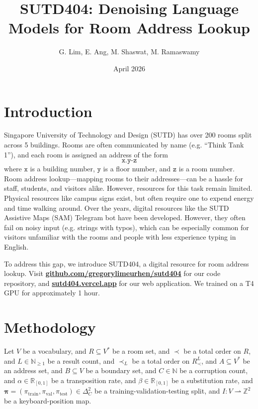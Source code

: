\documentclass{article}
\title{SUTD404: Denoising Language Models for Room Address Lookup}
\author{
	G. Lim,
	E. Ang,
	M. Shaswat,
	M. Ramaswamy
}
\date{April 2026}
\theoremstyle{definition}
\let\oldhref\href
\renewcommand{\href}[2]{\oldhref{#1}{\textbf{#2}}}
\newcommand{\N}{\mathbb{N}}
\newcommand{\R}{\mathbb{R}}
\newcommand{\Z}{\mathbb{Z}}
\begin{document}
\maketitle

\section{Introduction}

Singapore University of Technology and Design (SUTD) has over 200 rooms split across 5 buildings.
Rooms are often communicated by name (e.g. ``Think Tank 1''),
and each room is assigned an address of the form
$$\texttt{x.y-z}$$
where $\texttt{x}$ is a building number,
$\texttt{y}$ is a floor number,
and $\texttt{z}$ is a room number.
Room address lookup---mapping rooms to their addresses---can be a hassle for staff, students, and visitors alike.
However, resources for this task remain limited.
Physical resources like campus signs exist,
but often require one to expend energy and time walking around.
Over the years,
digital resources like
the SUTD Assistive Maps (SAM) Telegram bot
\citep{sam}
have been developed.
However, they often fail on noisy input (e.g. strings with typos),
which can be especially common for
visitors unfamiliar with the rooms
and people with less experience typing in English.

To address this gap,
we introduce SUTD404,
a digital resource for room address lookup.
Visit
\href{https://github.com/gregorylimeurhen/sutd404}{github.com/gregorylimeurhen/sutd404}
for our code repository, and
\href{https://sutd404.vercel.app}{sutd404.vercel.app}
for our web application.
We trained on a T4 GPU for approximately 1 hour.

\clearpage

\section{Methodology}


Let $V$ be a vocabulary,
and $R\subseteq V^{*}$ be a room set,
and $\prec$ be a total order on $R$,
and $L\in\N_{\geq 1}$ be a result count,
and $\prec_{L}$ be a total order on $R_{\prec}^{L}$,
and $A\subseteq V^{*}$ be an address set,
and $B\subseteq V$ be a boundary set,
and $C\in\N$ be a corruption count,
and $\alpha\in\R_{[0,1]}$ be a transposition rate,
and $\beta\in\R_{[0,1]}$ be a substitution rate,
and $\bm{\pi}=(\pi_\mathrm{train},\pi_\mathrm{val},\pi_\mathrm{test})\in\Delta_{C}^{2}$ be a training-validation-testing split,
and $I:V\rightharpoonup\Z^{2}$ be a keyboard-position map.
\end{document}
